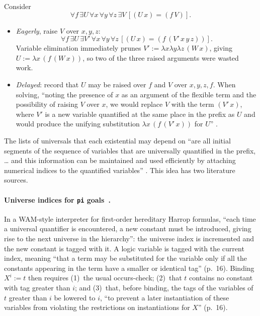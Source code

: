 \begin{example}\label{ex:hounif-8k}
Consider
\[\forall f\,\exists U\,\forall x\,\forall y\,\forall z\,\exists V\,[(U\,x)=(f\,V)].\]
\begin{itemize}
  \item \emph{Eagerly}, raise $V$ over $x,y,z$:
    \[\forall f\,\exists U\,\exists V'\,\forall x\,\forall y\,\forall z\,[(U\,x)=(f\,(V'\,x\,y\,z))].\]
    Variable elimination
    immediately prunes $V':=\lambda x\lambda y\lambda z\,(W\,x)$, giving $U:=\lambda x\,(f\,(W\,x))$, so two of the three raised
    arguments were wasted work.
  \item \emph{Delayed}: record that $U$ may be raised over $f$ and $V$ over $x,y,z,f$. When solving, \enquote{noting
    the presence of $x$ as an argument of the flexible term and the possibility of raising $V$ over $x$, we would
    replace $V$ with the term $(V'\,x)$, where $V'$ is a new variable quantified at the same place in the prefix as
    $U$ and would produce the unifying substitution $\lambda x\,(f\,(V'\,x))$ for $U$} .
\end{itemize}
\end{example}

The lists of universals that each existential may depend on \enquote{are all initial segments of the sequence of
variables that are universally quantified in the prefix, \dots{} and this information can be maintained and used
efficiently by attaching numerical indices to the quantified variables} . This idea has two
literature sources.

\paragraph{Universe indices for \texttt{pi} goals~\cite{NadathurJayaramanKwon1995}.} In a WAM-style interpreter for
first-order hereditary Harrop formulas, \enquote{each time a universal quantifier is encountered, a new constant must
be introduced, giving rise to the next universe in the hierarchy}: the universe index is incremented and the new
constant is tagged with it. A logic variable is tagged with the current index, meaning \enquote{that a term may be
substituted for the variable only if all the constants appearing in the term have a smaller or identical tag}
(p.~16). Binding $X^i:=t$ then requires (1)~the usual occurs-check; (2)~that $t$ contains no constant with tag
greater than $i$; and (3)~that, before binding, the tags of the variables of $t$ greater than $i$ be lowered to
$i$, \enquote{to prevent a later instantiation of these variables from violating the restrictions on instantiations
for $X$} (p.~16).

